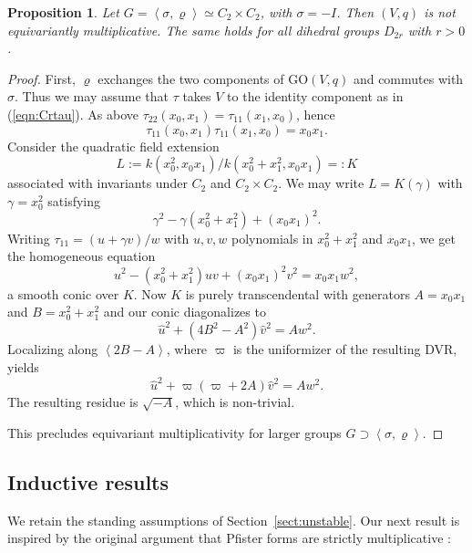 \documentclass[12pt]{amsart}
\numberwithin{equation}{section}
\newcommand{\GO}{\mathrm{GO}}
\theoremstyle{plain}
\newtheorem{prop}{Proposition}[section]
\theoremstyle{definition}
\theoremstyle{remark}
\begin{document}
\begin{prop}
Let $G=\left<\sigma,\varrho\right> \simeq C_2\times C_2$, with 
$\sigma=-I$. Then $(V,q)$ is not equivariantly multiplicative.
The same holds for all dihedral groups $D_{2r}$ with $r>0$.
\end{prop}
\begin{proof}
First, $\varrho$ exchanges the two components of 
$\GO(V,q)$ and commutes with $\sigma$. Thus we may 
assume that $\tau$ takes $V$ to the identity component
as in (\ref{eqn:Crtau}).
As above $\tau_{22}(x_0,x_1)=\tau_{11}(x_1,x_0)$, hence
$$\tau_{11}(x_0,x_1)\tau_{11}(x_1,x_0)=x_0x_1.$$
Consider the quadratic field extension
$$L:=k(x_0^2,x_0x_1) / k(x_0^2+x_1^2,x_0x_1)=:K$$
associated with invariants under $C_2$ and $C_2\times C_2$.
We may write $L=K(\gamma)$ with $\gamma=x_0^2$ satisfying
$$\gamma^2 - \gamma(x_0^2+x_1^2) + (x_0x_1)^2.$$
Writing $\tau_{11}=(u+\gamma v)/w$ with $u,v,w$ polynomials in 
$x_0^2+x_1^2$
and $x_0x_1$, we get the homogeneous equation
$$u^2-(x_0^2+x_1^2)uv + (x_0x_1)^2v^2 = x_0 x_1 w^2,$$
a smooth conic over $K$. Now $K$ is purely transcendental
with generators $A=x_0x_1$ and $B=x_0^2+x_1^2$ and our conic
diagonalizes to
$$\hat{u}^2 + (4B^2-A^2) \hat{v}^2 = Aw^2.$$
Localizing along $\left<2B-A\right>$,
where $\varpi$ is the uniformizer of the resulting DVR,
yields
$$\hat{u}^2 + \varpi (\varpi+2A) \hat{v}^2 = Aw^2.$$
The resulting residue is $\sqrt{-A}$, which is non-trivial.

This precludes equivariant multiplicativity for larger groups
$G \supset \left<\sigma,\varrho\right>$.
\end{proof}





\subsection*{Inductive results}
We retain the standing assumptions of
Section~\ref{sect:unstable}. 
Our next result is inspired by the original argument
that Pfister forms are strictly multiplicative
\cite[ch.~2]{Pfisterbook}:
\end{document}
